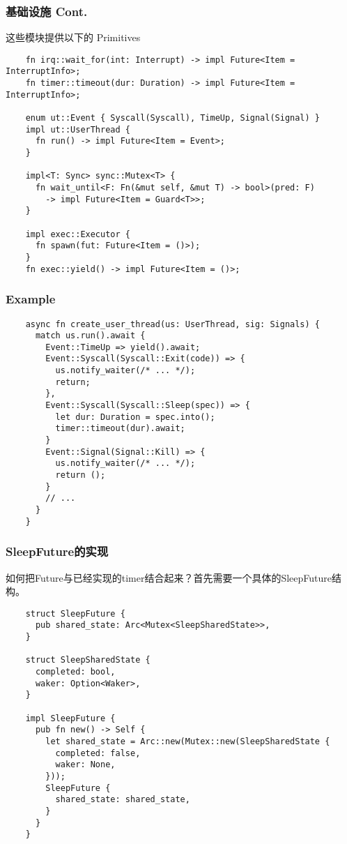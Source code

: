 \documentclass[UTF-8]{ctexbeamer}
\begin{document}
\begin{frame}[fragile]
  \frametitle{基础设施 Cont.}

  这些模块提供以下的 Primitives
  \vspace{1em}

  {
    \scriptsize
    \begin{verbatim}
    fn irq::wait_for(int: Interrupt) -> impl Future<Item = InterruptInfo>;
    fn timer::timeout(dur: Duration) -> impl Future<Item = InterruptInfo>;

    enum ut::Event { Syscall(Syscall), TimeUp, Signal(Signal) }
    impl ut::UserThread {
      fn run() -> impl Future<Item = Event>;
    }

    impl<T: Sync> sync::Mutex<T> {
      fn wait_until<F: Fn(&mut self, &mut T) -> bool>(pred: F)
        -> impl Future<Item = Guard<T>>;
    }

    impl exec::Executor {
      fn spawn(fut: Future<Item = ()>);
    }
    fn exec::yield() -> impl Future<Item = ()>;
  \end{verbatim}
  }
\end{frame}

\begin{frame}[fragile]
  \frametitle{Example}

  \scriptsize
  \begin{verbatim}
    async fn create_user_thread(us: UserThread, sig: Signals) {
      match us.run().await {
        Event::TimeUp => yield().await;
        Event::Syscall(Syscall::Exit(code)) => {
          us.notify_waiter(/* ... */);
          return;
        },
        Event::Syscall(Syscall::Sleep(spec)) => {
          let dur: Duration = spec.into();
          timer::timeout(dur).await;
        }
        Event::Signal(Signal::Kill) => {
          us.notify_waiter(/* ... */);
          return ();
        }
        // ...
      }
    }
  \end{verbatim}
\end{frame}

\begin{frame}[fragile]
  \frametitle{SleepFuture的实现}

  如何把Future与已经实现的timer结合起来？首先需要一个具体的SleepFuture结构。
  {
  \scriptsize
  \begin{verbatim}
    struct SleepFuture {
      pub shared_state: Arc<Mutex<SleepSharedState>>,
    }

    struct SleepSharedState {
      completed: bool,
      waker: Option<Waker>,
    }

    impl SleepFuture {
      pub fn new() -> Self {
        let shared_state = Arc::new(Mutex::new(SleepSharedState {
          completed: false,
          waker: None,
        }));
        SleepFuture {
          shared_state: shared_state,
        }
      }
    }
  \end{verbatim}
  }
\end{frame}
\end{document}

